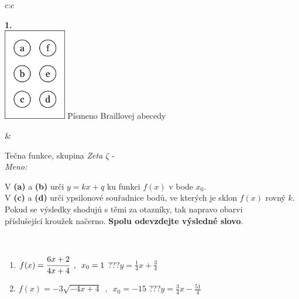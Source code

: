 \documentclass[10pt]{report}
\begin{document}
\begin{tabular}{c:c}
\begin{minipage}[c][104.5mm][t]{0.5\linewidth}
\begin{center}
\begin{minipage}{0.20\linewidth}
\begin{center}
{\Huge\bfseries 1.} \\[2mm]
\includegraphics[height=40mm]{../images/braille.png}
{\small Písmeno Braillovej abecedy}
\end{center}
\end{minipage}
\end{center}
\end{minipage}
&
\begin{minipage}[c][104.5mm][t]{0.5\linewidth}
\begin{center}
\vspace{7mm}
{\huge Tečna funkce, skupina \textit{Zeta $\zeta$} -}\\[5mm]
\textit{Meno:}\phantom{xxxxxxxxxxxxxxxxxxxxxxxxxxxxxxxxxxxxxxxxxxxxxxxxxxxxxxxxxxxxxxxxx}\\[5mm]
\begin{minipage}{0.95\linewidth}
\begin{center}
V \textbf{(a)} a \textbf{(b)} urči  $y = kx + q$ ku funkci $f(x)$ v bode $x_0$.\\V \textbf{(c)} a \textbf{(d)} urči ypsilonové souřadnice bodů, ve kterých je sklon $f(x)$ rovný $k$.\\Pokud se výsledky shodujú s těmi za otazníky, tak napravo obarvi\\příslušející kroužek načerno. \textbf{Spolu odevzdejte výsledné slovo}.
\end{center}
\end{minipage}
\\[1mm]
\begin{minipage}{0.79\linewidth}
\begin{center}
\begin{varwidth}{\linewidth}
\begin{enumerate}
\small
\item $f(x)=\cfrac{6x+2}{4x+4}\enspace , \enspace x_0=1$\quad \dotfill\; ???\;\dotfill \quad $y = \frac{1}{4}x+\frac{3}{4}$
\item $f(x)=-3\sqrt{-4x+4}\enspace , \enspace x_0=-15$\quad \dotfill\; ???\;\dotfill \quad $y = \frac{3}{4}x-\frac{51}{4}$

\end{enumerate}
\end{varwidth}
\end{center}
\end{minipage}
\end{center}
\end{minipage}
\end{tabular}
\end{document}
